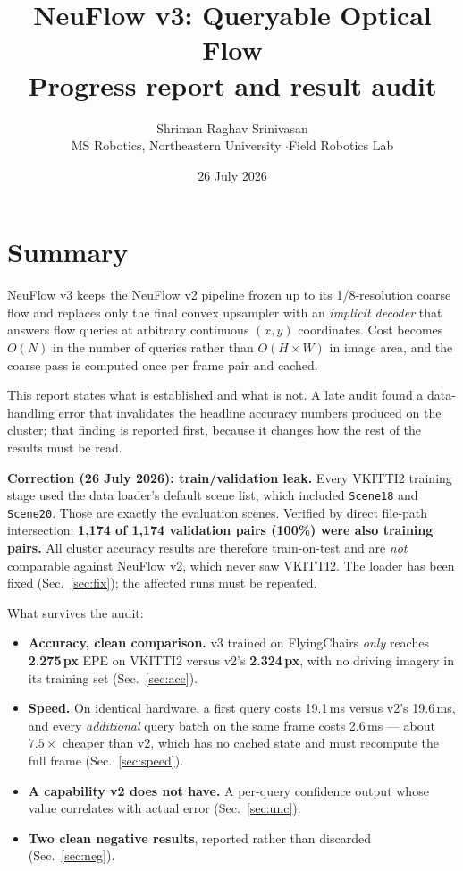\documentclass[11pt,a4paper]{article}
\title{\vspace{-1.5cm}\textbf{NeuFlow v3: Queryable Optical Flow}\\[0.2em]
\large Progress report and result audit}
\author{Shriman Raghav Srinivasan\\
\small MS Robotics, Northeastern University \quad$\cdot$\quad Field Robotics Lab}
\date{\small 26 July 2026}
\begin{document}
\maketitle
\vspace{-0.8cm}

\section{Summary}

NeuFlow v3 keeps the NeuFlow v2 pipeline frozen up to its 1/8-resolution coarse
flow and replaces only the final convex upsampler with an \emph{implicit
decoder} that answers flow queries at arbitrary continuous $(x,y)$ coordinates.
Cost becomes $O(N)$ in the number of queries rather than $O(H{\times}W)$ in
image area, and the coarse pass is computed once per frame pair and cached.

This report states what is established and what is not. A late audit found a
data-handling error that invalidates the headline accuracy numbers produced on
the cluster; that finding is reported first, because it changes how the rest of
the results must be read.

\begin{tcolorbox}[colback=bad!5,colframe=bad,boxrule=0.8pt,arc=2pt]
\textbf{Correction (26 July 2026): train/validation leak.}
Every VKITTI2 training stage used the data loader's default scene list, which
included \texttt{Scene18} and \texttt{Scene20}. Those are exactly the
evaluation scenes. Verified by direct file-path intersection: \textbf{1{,}174
of 1{,}174 validation pairs (100\%) were also training pairs.} All cluster
accuracy results are therefore train-on-test and are \emph{not} comparable
against NeuFlow v2, which never saw VKITTI2. The loader has been fixed
(Sec.~\ref{sec:fix}); the affected runs must be repeated.
\end{tcolorbox}

\noindent What survives the audit:
\begin{itemize}
  \item \textbf{Accuracy, clean comparison.} v3 trained on FlyingChairs
  \emph{only} reaches \textbf{2.275\,px} EPE on VKITTI2 versus v2's
  \textbf{2.324\,px}, with no driving imagery in its training set
  (Sec.~\ref{sec:acc}).
  \item \textbf{Speed.} On identical hardware, a first query costs
  19.1\,ms versus v2's 19.6\,ms, and every \emph{additional} query batch on the
  same frame costs 2.6\,ms --- about $7.5\times$ cheaper than v2, which has no
  cached state and must recompute the full frame (Sec.~\ref{sec:speed}).
  \item \textbf{A capability v2 does not have.} A per-query confidence output
  whose value correlates with actual error (Sec.~\ref{sec:unc}).
  \item \textbf{Two clean negative results}, reported rather than discarded
  (Sec.~\ref{sec:neg}).
\end{itemize}
\end{document}
